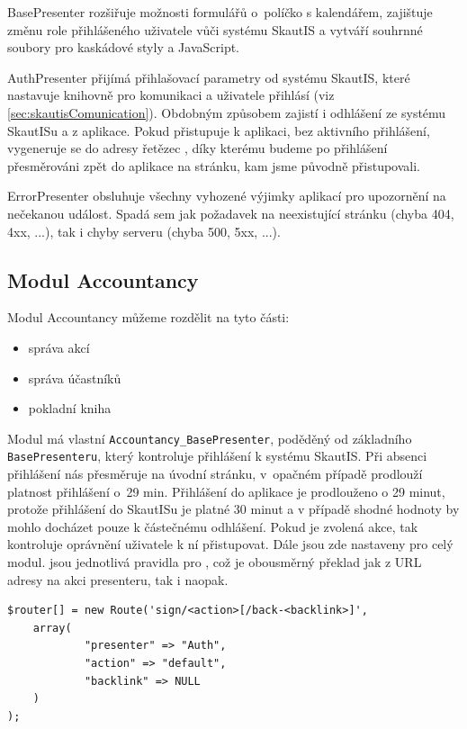 \documentclass[thesis=B,czech]{FITthesis}[2011/06/14]
\begin{document}
BasePresenter rozšiřuje možnosti formulářů o~políčko s kalendářem, zajištuje změnu role přihlášeného uživatele vůči systému SkautIS a vytváří souhrnné soubory pro kaskádové styly a JavaScript.

AuthPresenter přijímá přihlašovací parametry od systému SkautIS, které nastavuje knihovně pro komunikaci a uživatele přihlásí (viz \ref{sec:skautisComunication}). Obdobným způsobem zajistí i odhlášení ze systému SkautISu a z aplikace. Pokud přistupuje k aplikaci, bez aktivního přihlášení, vygeneruje se do adresy řetězec , díky kterému budeme po přihlášení přesměrováni zpět do aplikace na stránku, kam jsme původně přistupovali.

ErrorPresenter obsluhuje všechny vyhozené výjimky aplikací pro upozornění na nečekanou událost. Spadá sem jak požadavek na neexistující stránku (chyba 404, 4xx, ...), tak i chyby serveru (chyba 500, 5xx, ...).

\subsection{Modul Accountancy}

Modul Accountancy můžeme rozdělit na tyto části:
\begin{itemize}
	\item správa akcí
	\item správa účastníků
	\item pokladní kniha
\end{itemize}

Modul má vlastní \texttt{Accountancy\_BasePresenter}, poděděný od základního \texttt{BasePresenteru}, který kontroluje přihlášení k systému SkautIS. Při absenci přihlášení nás přesměruje na úvodní stránku, v~opačném případě prodlouží platnost přihlášení o~29 min. Přihlášení do aplikace je prodlouženo o 29 minut, protože přihlášení do SkautISu je platné 30 minut a v případě shodné hodnoty by mohlo docházet pouze k částečnému odhlášení. Pokud je zvolená akce, tak kontroluje oprávnění uživatele k ní přistupovat. Dále jsou zde nastaveny  pro celý modul.  jsou jednotlivá pravidla pro , což je obousměrný překlad jak z URL adresy na akci presenteru, tak i naopak.


\begin{lstlisting}[caption=routa pro přihlašovací presenter, label=route]
$router[] = new Route('sign/<action>[/back-<backlink>]',
	array(
    		"presenter" => "Auth",
    		"action" => "default",
    		"backlink" => NULL
	)
);
\end{lstlisting}
\end{document}
